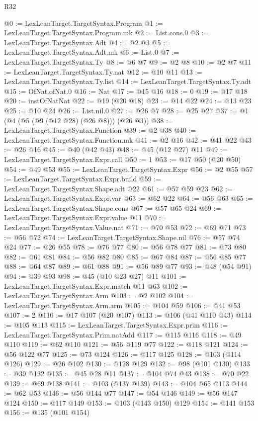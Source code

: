 \begin{lexlean}{R32}
\begin{coremodule}
{{{{{{{{{{{{{{{{@0 := LexLeanTarget.TargetSyntax.Program
@1 := LexLeanTarget.TargetSyntax.Program.mk
@2 := List.cons.{0}
@3 := LexLeanTarget.TargetSyntax.Adt
@4 := @2 @3
@5 := LexLeanTarget.TargetSyntax.Adt.mk
@6 := List.{0}
@7 := LexLeanTarget.TargetSyntax.Ty
@8 := @6 @7
@9 := @2 @8
@10 := @2 @7
@11 := LexLeanTarget.TargetSyntax.Ty.nat
@12 := @10 @11
@13 := LexLeanTarget.TargetSyntax.Ty.list
@14 := LexLeanTarget.TargetSyntax.Ty.adt
@15 := OfNat.ofNat.{0}
@16 := Nat
@17 := @15 @16
@18 := 0
@19 := @17 @18
@20 := instOfNatNat
@22 := @19 (@20 @18)
@23 := @14 @22
@24 := @13 @23
@25 := @10 @24
@26 := List.nil.{0}
@27 := @26 @7
@28 := @25 @27
@37 := @1 (@4 (@5 (@9 (@12 @28) (@26 @8))) (@26 @3))
@38 := LexLeanTarget.TargetSyntax.Function
@39 := @2 @38
@40 := LexLeanTarget.TargetSyntax.Function.mk
@41 := @2 @16
@42 := @41 @22
@43 := @26 @16
@45 := @40 (@42 @43)
@48 := @45 (@12 @27) @11
@49 := LexLeanTarget.TargetSyntax.Expr.call
@50 := 1
@53 := @17 @50 (@20 @50)
@54 := @49 @53
@55 := LexLeanTarget.TargetSyntax.Expr
@56 := @2 @55
@57 := LexLeanTarget.TargetSyntax.Expr.build
@59 := LexLeanTarget.TargetSyntax.Shape.adt @22
@61 := @57 @59 @23
@62 := LexLeanTarget.TargetSyntax.Expr.var
@63 := @62 @22
@64 := @56 @63
@65 := LexLeanTarget.TargetSyntax.Shape.cons
@67 := @57 @65 @24
@69 := LexLeanTarget.TargetSyntax.Expr.value @11
@70 := LexLeanTarget.TargetSyntax.Value.nat
@71 := @70 @53
@72 := @69 @71
@73 := @56 @72
@74 := LexLeanTarget.TargetSyntax.Shape.nil
@76 := @57 @74 @24
@77 := @26 @55
@78 := @76 @77
@80 := @56 @78 @77
@81 := @73 @80
@82 := @61 @81
@84 := @56 @82 @80
@85 := @67 @84
@87 := @56 @85 @77
@88 := @64 @87
@89 := @61 @88
@91 := @56 @89 @77
@93 := @48 (@54 @91)
@94 := @39 @93
@98 := @45 (@10 @23 @27) @11
@101 := LexLeanTarget.TargetSyntax.Expr.match @11 @63
@102 := LexLeanTarget.TargetSyntax.Arm
@103 := @2 @102
@104 := LexLeanTarget.TargetSyntax.Arm.arm
@105 := @104 @59
@106 := @41 @53
@107 := 2
@110 := @17 @107 (@20 @107)
@113 := @106 (@41 @110 @43)
@114 := @105 @113
@115 := LexLeanTarget.TargetSyntax.Expr.prim
@116 := LexLeanTarget.TargetSyntax.Prim.natAdd
@117 := @115 @116
@118 := @49 @110
@119 := @62 @110
@121 := @56 @119 @77
@122 := @118 @121
@124 := @56 @122 @77
@125 := @73 @124
@126 := @117 @125
@128 := @103 (@114 @126)
@129 := @26 @102
@130 := @128 @129
@132 := @98 (@101 @130)
@133 := @39 @132
@135 := @45 @28 @11
@137 := @104 @74 @43
@138 := @70 @22
@139 := @69 @138
@141 := @103 (@137 @139)
@143 := @104 @65 @113
@144 := @62 @53
@146 := @56 @144 @77
@147 := @54 @146
@149 := @56 @147 @124
@150 := @117 @149
@153 := @103 (@143 @150) @129
@154 := @141 @153
@156 := @135 (@101 @154)
}}}}}}}}}}}}}}}}
\end{coremodule}
\end{lexlean}
